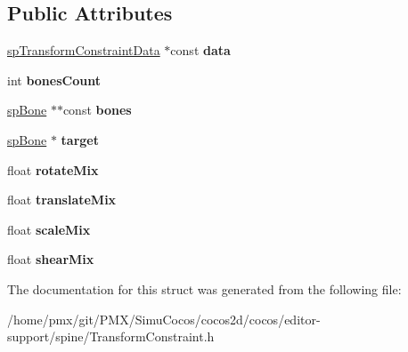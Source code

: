 \subsection*{Public Attributes}
\begin{DoxyCompactItemize}
\item 
\mbox{\label{structspTransformConstraint_a365f1c8cc28ea7571bb24ccd21a000d6}} 
\hyperlink{structspTransformConstraintData}{sp\+Transform\+Constraint\+Data} $\ast$const {\bfseries data}
\item 
\mbox{\label{structspTransformConstraint_ad169e67c20bee0bbe8c3d69aba41bde2}} 
int {\bfseries bones\+Count}
\item 
\mbox{\label{structspTransformConstraint_a64bf15cfcd9c7f143e0f8a47b8e6ed91}} 
\hyperlink{structspBone}{sp\+Bone} $\ast$$\ast$const {\bfseries bones}
\item 
\mbox{\label{structspTransformConstraint_a84090b626e79eeebde6d75f312f3d106}} 
\hyperlink{structspBone}{sp\+Bone} $\ast$ {\bfseries target}
\item 
\mbox{\label{structspTransformConstraint_adcb757a1d4f943e044a68d02de00b254}} 
float {\bfseries rotate\+Mix}
\item 
\mbox{\label{structspTransformConstraint_a345bc8054dec5d2e1a9e4279da18c1ef}} 
float {\bfseries translate\+Mix}
\item 
\mbox{\label{structspTransformConstraint_ae29d5ea78e839d41eb15c4fb22f81b38}} 
float {\bfseries scale\+Mix}
\item 
\mbox{\label{structspTransformConstraint_a58695fcdd8cd8152b5b90708c38af445}} 
float {\bfseries shear\+Mix}
\end{DoxyCompactItemize}


The documentation for this struct was generated from the following file\+:\begin{DoxyCompactItemize}
\item 
/home/pmx/git/\+P\+M\+X/\+Simu\+Cocos/cocos2d/cocos/editor-\/support/spine/Transform\+Constraint.\+h\end{DoxyCompactItemize}
